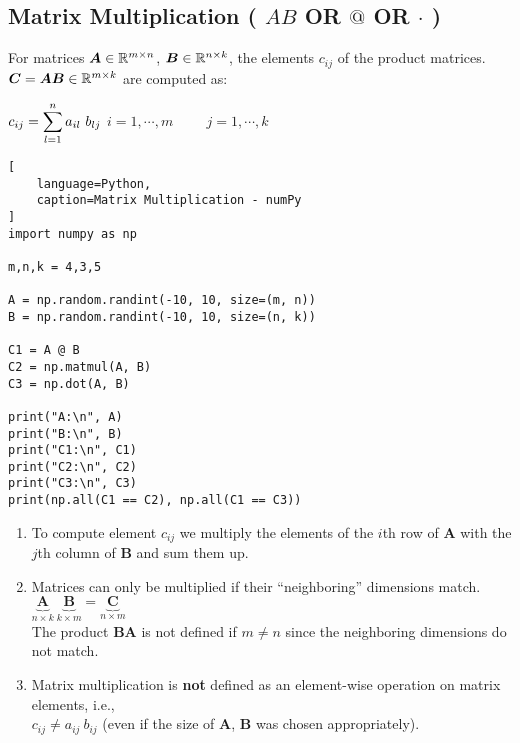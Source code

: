 \subsection{Matrix Multiplication ( $AB$ OR $@$ OR $\cdot$ ) \cite{mfml/book/mml/Deisenroth-Faisal-Ong}}

For matrices $\bm{A} \in \mathbb{R}^{m\times n}$, $\bm{B} \in \mathbb{R}^{n\times k}$, the elements $c_{ij}$ of the product matrices. $\bm{C} = \bm{AB} \in \mathbb{R}^{m\times k}$ are computed as:

\vspace{0.5cm}
\hfill
$
    c_{ij} = \dsum_{l=1}^n a_{il}\ b_{lj}
$
\hfill
$
    i = 1,\cdots,m
    \hspace{1cm}
    j = 1,\cdots,k
$
\hfill \cite{mfml/book/mml/Deisenroth-Faisal-Ong}





\begin{lstlisting}[
    language=Python,
    caption=Matrix Multiplication - numPy
]
import numpy as np

m,n,k = 4,3,5

A = np.random.randint(-10, 10, size=(m, n))
B = np.random.randint(-10, 10, size=(n, k))

C1 = A @ B
C2 = np.matmul(A, B)
C3 = np.dot(A, B)

print("A:\n", A)
print("B:\n", B)
print("C1:\n", C1)
print("C2:\n", C2)
print("C3:\n", C3)
print(np.all(C1 == C2), np.all(C1 == C3))
\end{lstlisting}




\vspace{0.5cm}

\begin{enumerate}
    \item To compute element $c_{ij}$ we multiply the elements of the $i$th row of $\bm{A}$ with the $j$th column of $\bm{B}$ and sum them up.
    \hfill \cite{mfml/book/mml/Deisenroth-Faisal-Ong}

    \item Matrices can only be multiplied if their “neighboring” dimensions match.
    \hfill \cite{mfml/book/mml/Deisenroth-Faisal-Ong}
    \\
    \hfill
    $
        \underset{n\times k}{\underbrace{\bm{A}}}\
        \underset{k\times m}{\underbrace{\bm{B}}}
        =
        \underset{n\times m}{\underbrace{\bm{C}}}
    $
    \hfill \cite{mfml/book/mml/Deisenroth-Faisal-Ong}
    \\
    The product $\bm{BA}$ is not defined if $m \neq n$ since the neighboring dimensions do not match.

    \item Matrix multiplication is \textbf{not} defined as an element-wise operation on matrix elements, i.e., 
    \\
    $c_{ij} \neq a_{ij}\ b_{ij}$ (even if the size of $\bm{A}$, $\bm{B}$ was chosen appropriately).
    \hfill \cite{mfml/book/mml/Deisenroth-Faisal-Ong}
\end{enumerate}


